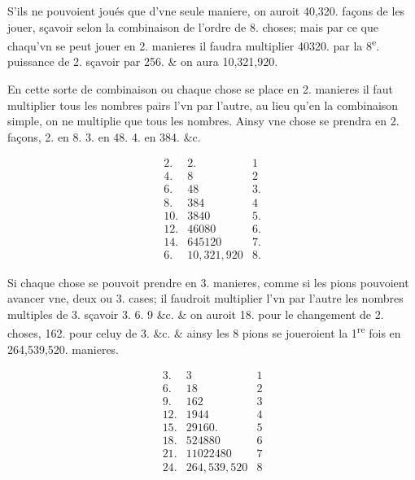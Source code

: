 \documentclass[11pt,a4paper]{article}
\begin{document}
S'ils ne pouvoient  joués que d'vne seule maniere, on auroit 40,320. façons de les jouer, sçavoir selon la combinaison de l'ordre de 8. choses; mais par ce que chaqu'vn se peut jouer en 2. manieres il faudra multiplier 40320. par la 8\textsuperscript{e}. puissance de 2. sçavoir par 256. \& on aura 10,321,920.

En cette sorte de combinaison ou chaque chose se place en 2. \ill{} manieres il faut multiplier tous les nombres pairs l'vn par l'autre, au lieu qu'en la combinaison simple, on ne multiplie que tous les nombres. Ainsy vne chose se prendra en 2. façons, 2. en 8. 3. en 48. 4. en 384. \&c.

\[
\begin{array}{rr|l}
2. & 2. & 1 \\
4. & 8 & 2 \\
6. & 48 & 3. \\
8. & 384 & 4 \\
10. & 3840 & 5. \\
12. & 46080 & 6. \\
14. & 645120 & 7. \\
6. & 10,321,920 & 8.
\end{array}
\]

Si chaque chose se pouvoit prendre en 3. manieres, comme si les pions pouvoient avancer vne, deux ou 3. cases; il faudroit multiplier l'vn par l'autre les nombres multiples de 3. sçavoir 3. 6. 9 \&c. \& on auroit 18. pour le changement de 2. choses, 162. pour celuy de 3. \&c. \& ainsy les 8 pions se joueroient la 1\textsuperscript{re} fois en 264,539,520. manieres.

\[
\begin{array}{rr|l}
3. & 3 & 1 \\
6. & 18 & 2 \\
9. & 162 & 3 \\
12. & 1944 & 4 \\
15. & 29160. & 5 \\
18. & 524880 & 6 \\
21. & 11022480 & 7 \\
24. & 264,539,520 & 8
\end{array}
\]
\end{document}
